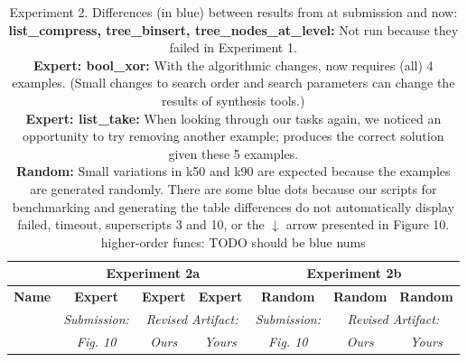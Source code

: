 \begin{table}

\experimentTableSize

\begin{tabular}{l|cccccc}
& \multicolumn{3}{c}{\textbf{Experiment 2a}}
& \multicolumn{3}{c}{\textbf{Experiment 2b}} \\\hline
\textbf{Name} &
\textbf{Expert} & \textbf{Expert} & \textbf{Expert} &
\textbf{Random} & \textbf{Random} & \textbf{Random} \\
&
\textit{Submission:} & \multicolumn{2}{c}{\textit{Revised Artifact:}} &
\textit{Submission:} & \multicolumn{2}{c}{\textit{Revised Artifact:}} \\
&
\textit{Fig. 10} & \textit{Ours} & \textit{Yours} &
\textit{Fig. 10} & \textit{Ours} & \textit{Yours} \\

\end{tabular}

\vspace{0.10in}

\caption{Experiment 2.
%
Differences (in blue) between results from \snsMyth{} at submission and
\snsMyth{} now:
%
\experimentCaptionSize
%
\\[3pt]
%
\textbf{list\_compress, tree\_binsert, tree\_nodes\_at\_level:} Not run because
they failed in Experiment 1.
%
\\[3pt]
%
\textbf{Expert: bool\_xor:} With the algorithmic changes, \snsMyth{} now
requires (all) 4 examples.  (Small changes to search order and search parameters
can change the results of synthesis tools.)
%
\\[3pt]
%
\textbf{Expert: list\_take:} When looking through our tasks again, we noticed an
opportunity to try removing another example; \snsMyth{} produces the correct
solution given these 5 examples.
%
\\[3pt]
%
\textbf{Random:} Small variations in k50 and k90 are expected because the
examples are generated randomly. There are some blue dots because our scripts
for benchmarking and generating the table differences do not automatically
display {\scriptsize{failed}}, {\scriptsize{timeout}}, superscripts 3 and 10, or
the $\downarrow$ arrow presented in Figure 10.
%
\\[3pt]
%
higher-order funcs: TODO should be blue nums
%
}

\end{table}
